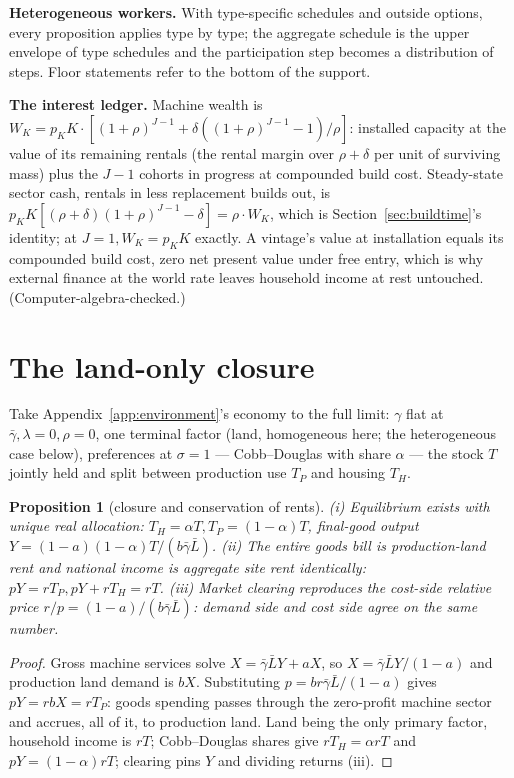 \documentclass[12pt]{article}
\theoremstyle{plain}
\newtheorem{proposition}{Proposition}
\begin{document}
\textbf{Heterogeneous workers.} With type-specific schedules and outside options, every proposition applies type by type; the aggregate schedule is the upper envelope of type schedules and the participation step becomes a distribution of steps. Floor statements refer to the bottom of the support.

\textbf{The interest ledger.} Machine wealth is $W_K = p_K K\cdot [(1+\rho )^{J-1} + \delta ((1+\rho )^{J-1} - 1)/\rho ]$: installed capacity at the value of its remaining rentals (the rental margin over $\rho +\delta$ per unit of surviving mass) plus the $J-1$ cohorts in progress at compounded build cost. Steady-state sector cash, rentals in less replacement builds out, is $p_K K[(\rho +\delta )(1+\rho )^{J-1} - \delta ] = \rho \cdot W_K$, which is Section~\ref{sec:buildtime}'s identity; at $J = 1, W_K = p_K K$ exactly. A vintage's value at installation equals its compounded build cost, zero net present value under free entry, which is why external finance at the world rate leaves household income at rest untouched. (Computer-algebra-checked.)

\section{The land-only closure}\label{app:landonly}

Take Appendix~\ref{app:environment}'s economy to the full limit: $\gamma$ flat at $\bar{\gamma}, \lambda = 0, \rho = 0$, one terminal factor (land, homogeneous here; the heterogeneous case below), preferences at $\sigma = 1$ --- Cobb--Douglas with share $\alpha$ --- the stock $T$ jointly held and split between production use $T_P$ and housing $T_H$.

\begin{proposition}[closure and conservation of rents]\label{prop:landonly}
(i) Equilibrium exists with unique real allocation: $T_H = \alpha T, T_P = (1-\alpha )T$, final-good output $Y = (1-a)(1-\alpha )T/(b\bar{\gamma}\bar{L})$. (ii) The entire goods bill is production-land rent and national income is aggregate site rent identically: $pY = rT_P, pY + rT_H = rT$. (iii) Market clearing reproduces the cost-side relative price $r/p = (1-a)/(b\bar{\gamma}\bar{L})$: demand side and cost side agree on the same number.
\end{proposition}

\begin{proof}
Gross machine services solve $X = \bar{\gamma}\bar{L}Y + aX$, so $X = \bar{\gamma}\bar{L}Y/(1-a)$ and production land demand is $bX$. Substituting $p = br\bar{\gamma}\bar{L}/(1-a)$ gives $pY = r bX = rT_P$: goods spending passes through the zero-profit machine sector and accrues, all of it, to production land. Land being the only primary factor, household income is $rT$; Cobb--Douglas shares give $rT_H = \alpha rT$ and $pY = (1-\alpha )rT$; clearing pins $Y$ and dividing returns (iii).
\end{proof}
\end{document}
